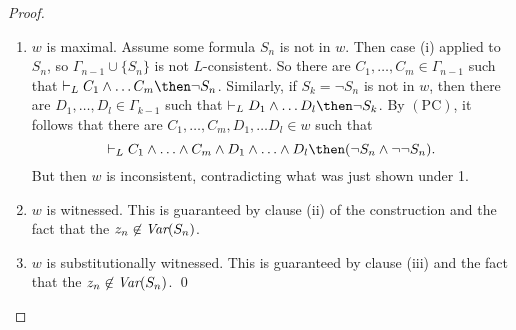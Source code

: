 \documentclass[11pt]{woarticle}
\theoremstyle{break}
\theoremstyle{nonumberplain}
\newcommand{\1}{\;\,|\;\,}
\newcommand{\var}{\emph{Var}}
\newcommand{\T}[1]{\ensuremath{(\mathrm{ #1})}}
\begin{document}
\begin{proof}
\begin{enumerate}
  \item $w$ is maximal. Assume some formula $S_n$ is not in $w$. Then
    case (i) applied to $S_n$, so $\Gamma_{n-1} \cup \{ S_n \}$ is not
    $L$-consistent. So there are $C_1,\ldots,C_m \in \Gamma_{n-1}$
    such that $\vdash_L C_1 \land \ldots C_m \then \neg
    S_n$. Similarly, if $S_k = \neg S_n$ is not in $w$, then there are
    $D_1,\ldots,D_l \in \Gamma_{k-1}$ such that $\vdash_L D_1 \land
    \ldots D_l \then \neg S_k$. By \T{PC}, it follows that there are
    $C_1,\ldots,C_m, D_1,\ldots D_l \in w$ such that
    \[
    \vdash_L C_1 \land \ldots \land C_m \land D_1 \land \ldots \land
    D_l \then (\neg S_n \land \neg \neg S_n).
    \]
    But then $w$ is inconsistent, contradicting what was just shown
    under 1.

  \item $w$ is witnessed. This is guaranteed by clause (ii) of the
    construction and the fact that the $z_n \not\in \var(S_n)$. 

  \item $w$ is substitutionally witnessed. This is guaranteed by
    clause (iii) and the fact that the $z_n \not\in \var(S_n)$. \qed

  \end{enumerate}

\end{proof}
\end{document}
